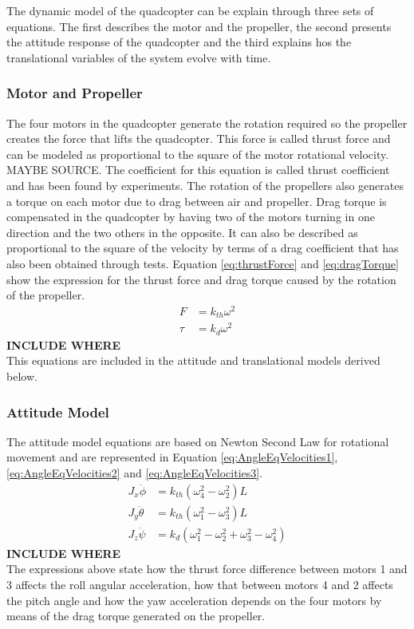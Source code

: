 \begin{itemize}
The dynamic model of the quadcopter can be explain through three sets of equations. The first describes the motor and the propeller, the second presents the attitude response of the quadcopter and the third explains hos the translational variables of the system evolve with time.
\subsubsection{Motor and Propeller}
The four motors in the quadcopter generate the rotation required so the propeller creates the force that lifts the quadcopter. This force is called thrust force and can be modeled as proportional to the square of the motor rotational velocity. MAYBE SOURCE. The coefficient for this equation is called thrust coefficient and has been found by experiments.  
The rotation of the propellers also generates a torque on each motor due to drag between air and propeller. Drag torque is compensated in the quadcopter by having two of the motors turning in one direction and the two others in the opposite. It can also be described as proportional to the square of the velocity by terms of a drag coefficient that has also been obtained through tests.
Equation \ref{eq:thrustForce} and \ref{eq:dragTorque} show the expression for the thrust force and drag torque caused by the rotation of the propeller.
\begin{align}
	F&=k_{th}\omega^2\label{eq:thrustForce}\\
	\tau&=k_{d}\omega^2\label{eq:dragTorque}
\end{align}
\textbf{INCLUDE WHERE}\\
This equations are included in the attitude and translational models derived below.
\subsubsection{Attitude Model}
The attitude model equations are based on Newton Second Law for rotational movement and are represented in Equation \ref{eq:AngleEqVelocities1}, \ref{eq:AngleEqVelocities2} and \ref{eq:AngleEqVelocities3}. 
\begin{align}
	J_x\ddot{\phi}&=k_{th} (\omega^2_4-\omega^2_2)  L \label{eq:AngleEqVelocities1}\\
	J_y \ddot{\theta}&=k_{th} (\omega^2_1-\omega^2_3)  L \label{eq:AngleEqVelocities2} \\
	J_z\ddot{\psi}&=k_d (\omega^2_1-\omega^2_2+\omega^2_3-\omega^2_4)\label{eq:AngleEqVelocities3}
\end{align}
\textbf{INCLUDE WHERE}\\
The expressions above state how the thrust force difference between motors 1 and 3 affects the roll angular acceleration, how that between motors 4 and 2 affects the pitch angle and how the yaw acceleration depends on the four motors by means of the drag torque generated on the propeller.  

\end{itemize}
